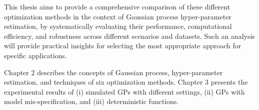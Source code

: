 

This thesis aims to provide a comprehensive comparison of these different optimization methods in the context of Gaussian process hyper-parameter estimation, by systematically evaluating their performance, computational efficiency, and robustness across different scenarios and datasets. Such an analysis will provide practical insights for selecting the most appropriate approach for specific applications. 

Chapter 2 describes the concepts of Gaussian process, hyper-parameter estimation, and techniques of six optimization methods. Chapter 3 presents the experimental results of (i) simulated GPs with different settings, (ii) GPs with model mis-specification, and (iii) deterministic functions.



